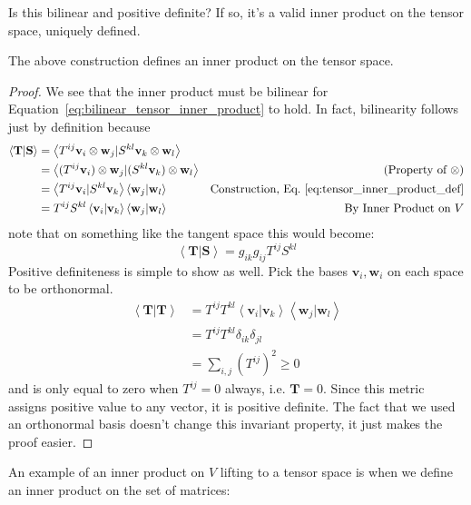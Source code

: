 \documentclass[../master.tex]{subfiles}
\begin{document}
	Is this bilinear and positive definite? If so, it's a valid inner product on the tensor space, uniquely defined.
	\begin{prop}
		The above construction defines an inner product on the tensor space.
	\end{prop} 
	\begin{proof}
		We see that the inner product must be bilinear for Equation~\eqref{eq:bilinear_tensor_inner_product} to hold. In fact, bilinearity follows just by definition because
		\begin{align*}
			\left< \mathbf{T} | \mathbf{S} \right> 
			&= \left< T^{ij} \mathbf v_i \otimes \mathbf w_j | S^{kl} \mathbf v_k \otimes \mathbf w_l \right> & \\
			&= \left< (T^{ij} \mathbf v_i) \otimes \mathbf w_j | (S^{kl} \mathbf v_k) \otimes \mathbf w_l \right>  & \text{(Property of $\otimes$)}\\
			& =\left< T^{ij} \mathbf v_i | S^{kl} \mathbf v_k \right> \left< \mathbf w_j | \mathbf w_l \right> & \text{Construction, Eq.~\eqref{eq:tensor_inner_product_def}}\\
			& = T^{ij} S^{kl} \left< \mathbf v_i | \mathbf v_k \right> \left< \mathbf w_j | \mathbf w_l \right> & \text{By Inner Product on $V$}
		\end{align*}
		note that on something like the tangent space this would become:
		\begin{equation}
			\left< \mathbf{T} | \mathbf{S} \right> = g_{ik} g_{ij} T^{ij} S^{kl}
		\end{equation}
		Positive definiteness is simple to show as well. Pick the bases $\mathbf v_i, \mathbf w_i$ on each space to be orthonormal. 
		\begin{align*}
			\left< \mathbf{T} | \mathbf{T} \right> 
			&= T^{ij} T^{kl} \left< \mathbf v_i | \mathbf v_k \right> \left< \mathbf w_j | \mathbf w_l \right> \\
			&= T^{ij} T^{kl} \delta_{ik} \delta_{jl} \\
			&= \sum_{i, j} (T^{ij})^2 \geq 0
		\end{align*}
		and is only equal to zero when $T^{ij}=0$ always, i.e. $\mathbf T = 0$. Since this metric assigns positive value to any vector, it is positive definite. The fact that we used an orthonormal basis doesn't change this invariant property, it just makes the proof easier. 
	\end{proof}
	An example of an inner product on $V$ lifting to a tensor space is when we define an inner product on the set of matrices:
\end{document}
